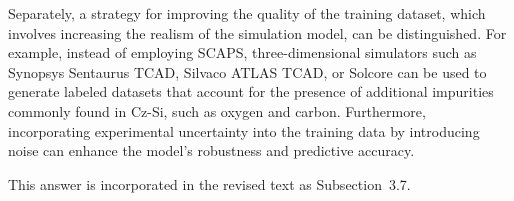 \documentclass[a4paper,fleqn]{cas-sc}
\begin{document}
Separately, a strategy for improving the quality of the training dataset,
which involves increasing the realism of the simulation model, can be distinguished.
For example, instead of employing SCAPS, three-dimensional simulators such as Synopsys Sentaurus TCAD,
Silvaco ATLAS TCAD, or Solcore can be used to generate labeled datasets
that account for the presence of additional impurities commonly found in Cz-Si,
such as oxygen and carbon.
Furthermore, incorporating experimental uncertainty into the training data by introducing noise
can enhance the model’s robustness and predictive accuracy.

This answer is incorporated in the revised text as Subsection~3.7.


%
%
%
%
%
\end{document}
